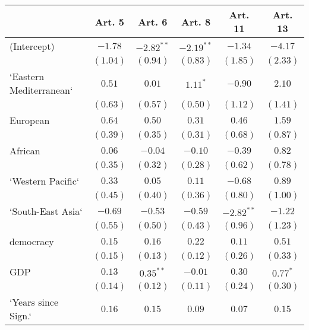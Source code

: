 
\begin{table}[!h]
\begin{center}
\begin{tabular}{l c c c c c }
\toprule
 & Art. 5 & Art. 6 & Art. 8 & Art. 11 & Art. 13 \\
\midrule
(Intercept)             & $-1.78$      & $-2.82^{**}$ & $-2.19^{**}$ & $-1.34$      & $-4.17$      \\
                        & $(1.04)$     & $(0.94)$     & $(0.83)$     & $(1.85)$     & $(2.33)$     \\
`Eastern Mediterranean` & $0.51$       & $0.01$       & $1.11^{*}$   & $-0.90$      & $2.10$       \\
                        & $(0.63)$     & $(0.57)$     & $(0.50)$     & $(1.12)$     & $(1.41)$     \\
European                & $0.64$       & $0.50$       & $0.31$       & $0.46$       & $1.59$       \\
                        & $(0.39)$     & $(0.35)$     & $(0.31)$     & $(0.68)$     & $(0.87)$     \\
African                 & $0.06$       & $-0.04$      & $-0.10$      & $-0.39$      & $0.82$       \\
                        & $(0.35)$     & $(0.32)$     & $(0.28)$     & $(0.62)$     & $(0.78)$     \\
`Western Pacific`       & $0.33$       & $0.05$       & $0.11$       & $-0.68$      & $0.89$       \\
                        & $(0.45)$     & $(0.40)$     & $(0.36)$     & $(0.80)$     & $(1.00)$     \\
`South-East Asia`       & $-0.69$      & $-0.53$      & $-0.59$      & $-2.82^{**}$ & $-1.22$      \\
                        & $(0.55)$     & $(0.50)$     & $(0.43)$     & $(0.96)$     & $(1.23)$     \\
democracy               & $0.15$       & $0.16$       & $0.22$       & $0.11$       & $0.51$       \\
                        & $(0.15)$     & $(0.13)$     & $(0.12)$     & $(0.26)$     & $(0.33)$     \\
GDP                     & $0.13$       & $0.35^{**}$  & $-0.01$      & $0.30$       & $0.77^{*}$   \\
                        & $(0.14)$     & $(0.12)$     & $(0.11)$     & $(0.24)$     & $(0.30)$     \\
`Years since Sign.`     & $0.16$       & $0.15$       & $0.09$       & $0.07$       & $0.15$       \\

\end{tabular}
\end{center}
\end{table}
